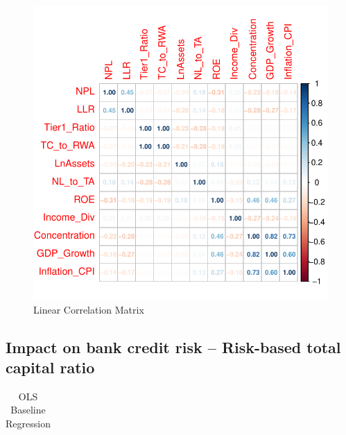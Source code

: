 \documentclass[
  12pt,
  a4paper,
]{scrreprt}
\begin{document}
{{{{\begin{figure}[H]
{\includegraphics{chapter01-credit_risk_files/figure-pdf/fig-correlation-1.pdf}

}

\caption{\label{fig-correlation}Linear Correlation Matrix}

\end{figure}%

\subsection{Impact on bank credit risk -- Risk-based total capital
ratio}\label{impact-on-bank-credit-risk-risk-based-total-capital-ratio}

\begin{longtable}[]{@{}ccccc@{}}

\caption{\label{tbl-baseline}OLS Baseline Regression}

\tabularnewline


\end{longtable}}}}}
\end{document}
